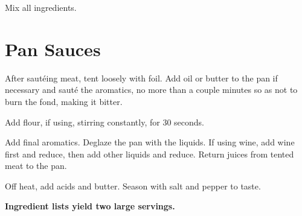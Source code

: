 \documentclass[oneside]{book}  %
\def\thisrecipe{}  %
\newcommand{\recipe}[1]{\section{#1}\def\thisrecipe{: #1}} %
\begin{document}
\begin{directions}
  \item Mix all ingredients.
\end{directions}
\recipe{Pan Sauces} \label{recipe:pan_sauces} %

\begin{directions}
  \item After saut\'eing meat, tent loosely with foil. Add oil or butter to the
  pan if necessary and saut\'e the aromatics, no more than a couple minutes so
  as not to burn the fond, making it bitter.

  \item Add flour, if using, stirring constantly, for 30 seconds.

  \item Add final aromatics. Deglaze the pan with the liquids. If using wine,
  add wine first and reduce, then add other liquids and reduce. Return juices
  from tented meat to the pan.

  \item Off heat, add acids and butter. Season with salt and pepper to taste.
\end{directions}

\noindent\textbf{Ingredient lists yield two large servings.}
\end{document}
